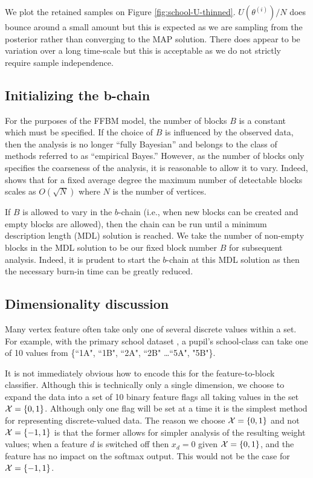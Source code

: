 We plot the retained samples on Figure \ref{fig:school-U-thinned}. $U(\theta^{(i)})/N$ does bounce around a small amount but this is expected as we are sampling from the posterior rather than converging to the MAP solution. There does appear to be variation over a long time-scale but this is acceptable as we do not strictly require sample independence.
\FloatBarrier
\subsection{Initializing the b-chain}

For the purposes of the FFBM model, the number of blocks $B$ is a constant 
which must be specified. If the choice of $B$ is influenced 
by the observed data, then the analysis is no longer ``fully Bayesian''
and belongs to the class of methods referred to as ``empirical Bayes.''
However, as the number of blocks only specifies the coarseness of the 
analysis, it is reasonable to allow it to vary. Indeed, 
\citet{peixoto-determine-B} shows that for a fixed 
average degree the maximum number of detectable blocks scales 
as $O(\sqrt{N})$ where $N$ is the number of vertices.

If $B$ is allowed to vary in the $b$-chain (i.e.,
when new blocks can be created and empty blocks are allowed),
then the chain can be run until a minimum description 
length (MDL) solution is reached. We take the number of non-empty blocks 
in the MDL solution to be our fixed block number $B$ for subsequent analysis. 
Indeed, it is prudent to start the $b$-chain at this MDL solution as then 
the necessary burn-in time can be greatly reduced.

\subsection{Dimensionality discussion}
\label{appdx:dimension}

Many vertex feature often take only one of several discrete values within a set. For example, with the primary school dataset \cite{schools}, a pupil's school-class can take one of 10 values from \{``1A", ``1B", ``2A", ``2B" \dots ``5A", "5B"\}.

It is not immediately obvious how to encode this for the feature-to-block classifier. Although this is technically only a single dimension, we choose to expand the data into a set of 10 binary feature flags all taking values in the set $\mathcal{X} = \{0, 1\}$. Although only one flag will be set at a time it is the simplest method for representing discrete-valued data. The reason we choose $\mathcal{X}=\{0, 1\}$ and not $\mathcal{X} = \{-1, 1\}$ is that the former allows for simpler analysis of the resulting weight values; when a feature $d$ is switched off then $x_{d}=0$ given $\mathcal{X} = \{0, 1\}$, and the feature has no impact on the softmax output. This would not be the case for $\mathcal{X} = \{-1, 1\}$.


